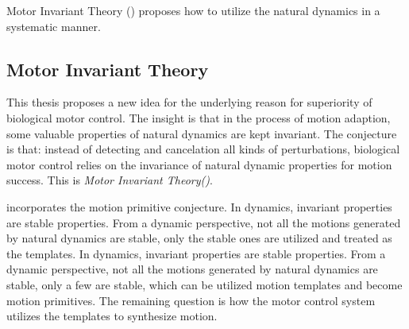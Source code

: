 Motor Invariant Theory (\moit)  proposes  how to utilize the natural dynamics in a systematic manner.








\subsection{Motor Invariant Theory}
%
%
%





This thesis proposes a new idea for the underlying reason for superiority of biological motor control.
The insight is that in the process of motion adaption, some valuable properties of natural dynamics are kept invariant.
The conjecture is that:  instead of detecting and cancelation all kinds of perturbations, biological motor control relies on the invariance of natural dynamic properties for motion success.
This is \emph{Motor Invariant Theory(\moit)}.


\moit incorporates the motion primitive conjecture.
In dynamics, invariant properties are stable properties. 
From a dynamic perspective, not all the motions generated by natural dynamics are stable, only the stable ones are utilized and treated as the templates.
In dynamics, invariant properties are stable properties.
From a dynamic perspective, not all the motions generated by natural dynamics are stable, only a few are stable, which can be utilized motion templates and become motion primitives.
The remaining question is how the motor control system utilizes the templates to synthesize motion.

